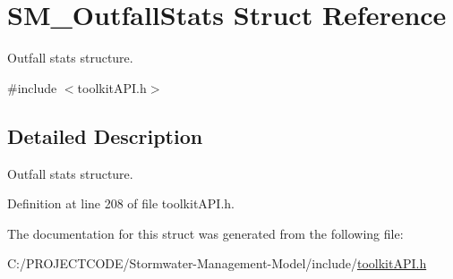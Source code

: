 \hypertarget{struct_s_m___outfall_stats}{}\section{S\+M\+\_\+\+Outfall\+Stats Struct Reference}
\label{struct_s_m___outfall_stats}


Outfall stats structure.  




{\ttfamily \#include $<$toolkit\+A\+P\+I.\+h$>$}



\subsection{Detailed Description}
Outfall stats structure. 

Definition at line 208 of file toolkit\+A\+P\+I.\+h.



The documentation for this struct was generated from the following file\+:\begin{DoxyCompactItemize}
\item 
C\+:/\+P\+R\+O\+J\+E\+C\+T\+C\+O\+D\+E/\+Stormwater-\/\+Management-\/\+Model/include/\hyperlink{toolkit_a_p_i_8h}{toolkit\+A\+P\+I.\+h}\end{DoxyCompactItemize}
